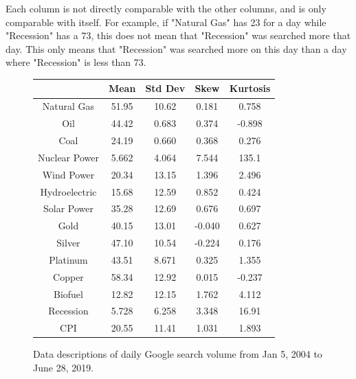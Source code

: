 \documentclass[final]{cvpr}
\begin{document}
    Each column is not directly comparable with the other columns, and is only
    comparable with itself. For example, if "Natural Gas" has 23 for a day while
    "Recession" has a 73, this does not mean that "Recession" was searched more
    that day. This only means that "Recession" was searched more on this day
    than a day where "Recession" is less than 73.

    \begin{figure}[h]
        \caption{Data descriptions of daily Google search volume from Jan 5, 
            2004 to June 28, 2019.} 
        \center
        \begin{tabular}{| c || c | c | c | c |}
            \hline 
            & Mean & Std Dev & Skew & Kurtosis\\ 
            \hline
            \hline
            Natural Gas   & 51.95 & 10.62 &  0.181 &  0.758\\
            Oil           & 44.42 & 0.683 &  0.374 & -0.898\\
            Coal          & 24.19 & 0.660 &  0.368 &  0.276\\
            Nuclear Power & 5.662 & 4.064 &  7.544 &  135.1\\
            Wind Power    & 20.34 & 13.15 &  1.396 &  2.496\\
            Hydroelectric & 15.68 & 12.59 &  0.852 &  0.424\\
            Solar Power   & 35.28 & 12.69 &  0.676 &  0.697\\
            Gold          & 40.15 & 13.01 & -0.040 &  0.627\\
            Silver        & 47.10 & 10.54 & -0.224 &  0.176\\
            Platinum      & 43.51 & 8.671 &  0.325 &  1.355\\
            Copper        & 58.34 & 12.92 &  0.015 & -0.237\\
            Biofuel       & 12.82 & 12.15 &  1.762 &  4.112\\
            Recession     & 5.728 & 6.258 &  3.348 &  16.91\\
            CPI           & 20.55 & 11.41 &  1.031 &  1.893\\
            \hline
        \end{tabular}
        \label{fig:google_trends_desc}
    \end{figure}
\end{document}
